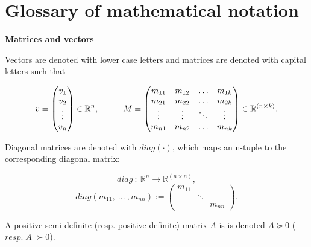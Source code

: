 \newpage
\section*{Glossary of mathematical notation}

\textbf{Matrices and vectors}

Vectors are denoted with lower case letters and matrices are denoted with capital letters such that

\vspace{-6mm}
 \begin{equation*}
 v = 
 \begin{pmatrix}

 		 v_1 	\\
		 v_2 	\\
 		 \vdots \\
		 v_n

 \end{pmatrix}
 \in {\mathbb{R}}^{n},
 \hspace{10mm}
 M = 
 \begin{pmatrix}

 		 m_{11} & m_{12} & \hdots & m_{1k}	\\
 		 m_{21} & m_{22} & \hdots & m_{2k}	\\
 		 \vdots & \vdots & \ddots & \vdots	\\
 		 m_{n1} & m_{n2} & \hdots &m_{nk} \\

 \end{pmatrix}
 \in {\mathbb{R}}^{(n \times k)}.
 \end{equation*}

Diagonal matrices are denoted with $diag(\cdot)$, which maps an n-tuple to the corresponding diagonal matrix:
\vspace{-5mm}

\begin{equation*}
diag \: : \: \mathbb{R}^{n} \rightarrow \mathbb{R}^{(n \times n)},
\end{equation*}
\begin{equation*}
diag(m_{11},\: ... \:, m_{nn} ) := 
\begin{pmatrix}
    m_{11} & & \\
    & \ddots & \\
    & & m_{nn}
  \end{pmatrix}.
  \end{equation*}

A positive semi-definite (resp. positive definite) matrix $A$ is is denoted $A \succeq 0$ ($resp.\; A \; \succ 0$).

